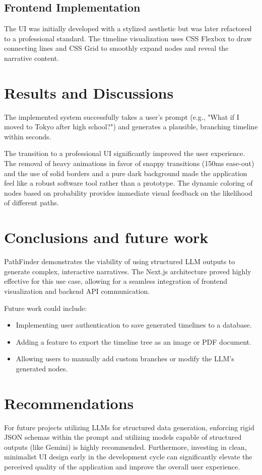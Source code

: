 \documentclass[12pt,a4paper]{report}
\begin{document}
\section{Frontend Implementation}
The UI was initially developed with a stylized aesthetic but was later refactored to a professional standard. The timeline visualization uses CSS Flexbox to draw connecting lines and CSS Grid to smoothly expand nodes and reveal the narrative content.

\chapter{Results and Discussions}
The implemented system successfully takes a user's prompt (e.g., "What if I moved to Tokyo after high school?") and generates a plausible, branching timeline within seconds. 
\par\noindent
The transition to a professional UI significantly improved the user experience. The removal of heavy animations in favor of snappy transitions (150ms ease-out) and the use of solid borders and a pure dark background made the application feel like a robust software tool rather than a prototype. The dynamic coloring of nodes based on probability provides immediate visual feedback on the likelihood of different paths.

\chapter{Conclusions and future work}
PathFinder demonstrates the viability of using structured LLM outputs to generate complex, interactive narratives. The Next.js architecture proved highly effective for this use case, allowing for a seamless integration of frontend visualization and backend API communication.
\par\noindent
Future work could include:
\begin{itemize}
    \item Implementing user authentication to save generated timelines to a database.
    \item Adding a feature to export the timeline tree as an image or PDF document.
    \item Allowing users to manually add custom branches or modify the LLM's generated nodes.
\end{itemize}

\chapter{Recommendations}
For future projects utilizing LLMs for structured data generation, enforcing rigid JSON schemas within the prompt and utilizing models capable of structured outputs (like Gemini) is highly recommended. Furthermore, investing in clean, minimalist UI design early in the development cycle can significantly elevate the perceived quality of the application and improve the overall user experience.
\end{document}
